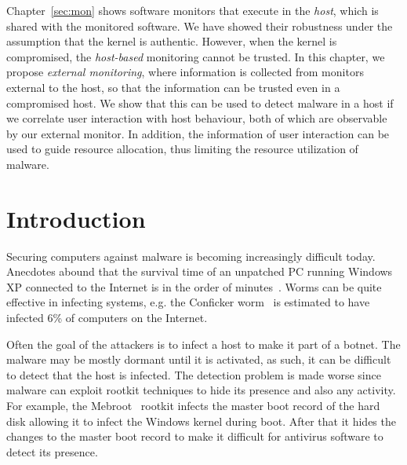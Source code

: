
Chapter~\ref{sec:mon} shows software monitors that execute in the {\em host},
which is shared with the monitored software.
We have showed their robustness under the assumption that the kernel is
authentic.
However, when the kernel is compromised, the {\em host-based} monitoring
cannot be trusted.
In this chapter,
we propose {\em external monitoring}, where information is collected from
monitors external to the host, so that the information can be trusted
even in a compromised host.
We show that this can be used to detect malware in a host if
we correlate user interaction with host behaviour,
both of which are observable by our external monitor.
In addition, the information of user interaction can be used to guide
resource allocation, thus limiting the resource utilization of malware.

\section{Introduction}

Securing computers against malware is becoming increasingly difficult today.
Anecdotes abound that the survival time
of an unpatched PC running Windows XP connected to the Internet 
is in the order of minutes~\cite{Survival1,Survival2}.
Worms can be quite effective in infecting systems, e.g.
the Conficker worm~\cite{conficker6}
is estimated to have infected 6\% of computers on the Internet.

Often the goal of the attackers is to infect a host to make it part
of a botnet.
The malware may be mostly dormant until it is activated,
as such, it can be difficult to detect that the host is infected.
The detection problem is made worse since malware can exploit rootkit
techniques to hide its presence and also any activity.
For example, the Mebroot~\cite{alkio2008mbr} rootkit infects the master boot
record of the hard disk allowing it to infect the Windows kernel during boot.
After that it hides the changes to the master boot record to make it
difficult for antivirus software to detect its presence.

